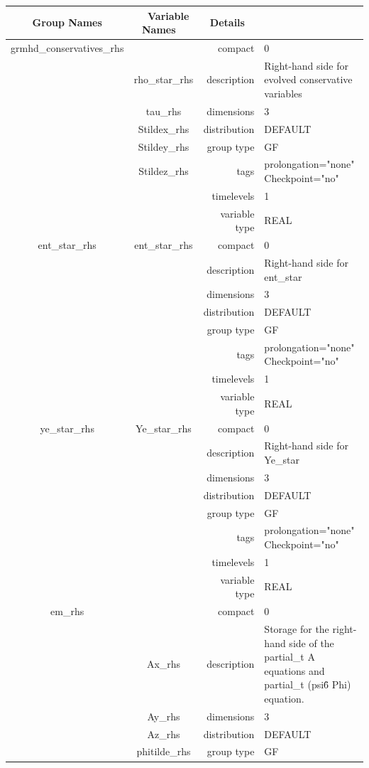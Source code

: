 \begin{tabular*}{150mm}{|c|c@{\extracolsep{\fill}}|rl|} \hline 
~ {\bf Group Names} ~ & ~ {\bf Variable Names} ~  &{\bf Details} ~ & ~ \\ 
\hline 
grmhd\_conservatives\_rhs &  & compact & 0 \\ 
 & rho\_star\_rhs & description & Right-hand side for evolved conservative variables \\ 
 & tau\_rhs & dimensions & 3 \\ 
 & Stildex\_rhs & distribution & DEFAULT \\ 
 & Stildey\_rhs & group type & GF \\ 
 & Stildez\_rhs & tags & prolongation="none" Checkpoint="no" \\ 
 &  & timelevels & 1 \\ 
 &  & variable type & REAL \\ 
\hline 
ent\_star\_rhs & ent\_star\_rhs & compact & 0 \\ 
 &  & description & Right-hand side for ent\_star \\ 
 &  & dimensions & 3 \\ 
 &  & distribution & DEFAULT \\ 
 &  & group type & GF \\ 
 &  & tags & prolongation="none" Checkpoint="no" \\ 
 &  & timelevels & 1 \\ 
 &  & variable type & REAL \\ 
\hline 
ye\_star\_rhs & Ye\_star\_rhs & compact & 0 \\ 
 &  & description & Right-hand side for Ye\_star \\ 
 &  & dimensions & 3 \\ 
 &  & distribution & DEFAULT \\ 
 &  & group type & GF \\ 
 &  & tags & prolongation="none" Checkpoint="no" \\ 
 &  & timelevels & 1 \\ 
 &  & variable type & REAL \\ 
\hline 
em\_rhs &  & compact & 0 \\ 
 & Ax\_rhs & description & Storage for the right-hand side of the partial\_t A equations and partial\_t (psi\^6 Phi) equation. \\ 
 & Ay\_rhs & dimensions & 3 \\ 
 & Az\_rhs & distribution & DEFAULT \\ 
 & phitilde\_rhs & group type & GF \\ 

\end{tabular*}
